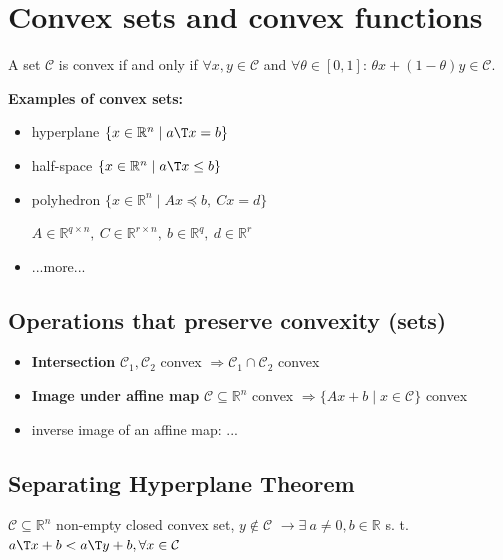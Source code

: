 \section{Convex sets and convex functions}

\begin{definition}
	A set $\mathcal{C}$ is convex if and only if
	$\forall x,y \in \mathcal{C}$ and
	$\forall \theta \in [0,1]$: \quad
	$\theta x + (1-\theta)y \in \mathcal{C}$.
\end{definition}


\textbf{Examples of convex sets:}
\begin{itemize}
	\item
	      hyperplane $\{x \in \mathbb{R}^n \mid a\T x=b\}$
	\item
	      half-space $\{x \in \mathbb{R}^n \mid a\T x\le b\}$
	\item
	      polyhedron $\{x \in \mathbb{R}^n \mid Ax \preceq b ,\ Cx = d\}$

	      $A \in \mathbb{R}^{q\times n},\ C \in \mathbb{R}^{r\times n},\ b \in \mathbb{R}^{q},\ d\in \mathbb{R}^{r}$
	\item
	      ...more...

\end{itemize}

\subsection{Operations that preserve convexity (sets)}

\begin{itemize}
	\item \textbf{Intersection}
	      $\mathcal{C}_1, \mathcal{C}_2$ convex $\Rightarrow \mathcal{C}_1 \cap \mathcal{C}_2$ convex
	\item \textbf{Image under affine map}
	      $\mathcal{C} \subseteq  \mathbb{R}^{n}$ convex
	      $\Rightarrow \{Ax+b \mid x \in \mathcal{C} \}$ convex
	\item inverse image of an affine map:
	      ...
\end{itemize}

\subsection{Separating Hyperplane Theorem}

\begin{theorem}
	$\mathcal{C} \subseteq \mathbb{R}^{n}$ non-empty closed convex set, $y \notin \mathcal{C}$
	$\rightarrow \exists\ a \ne 0, b \in \mathbb{R}$
	s. t. $a\T x + b < a\T y + b,
		\forall x \in \mathcal{C}$
\end{theorem}

